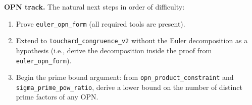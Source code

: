 \documentclass[12pt,a4paper]{article}
\begin{document}
\textbf{OPN track.} The natural next steps in order of difficulty:

\begin{enumerate}
    \item Prove \texttt{euler\_opn\_form} (all required tools are present).
    \item Extend to \texttt{touchard\_congruence\_v2} without the Euler decomposition as a hypothesis
(i.e., derive the decomposition inside the proof from \texttt{euler\_opn\_form}).
    \item Begin the prime bound argument: from \texttt{opn\_product\_constraint} and \texttt{sigma\_prime\_pow\_ratio},
derive a lower bound on the number of distinct prime factors of any OPN.
\end{enumerate}
\end{document}
